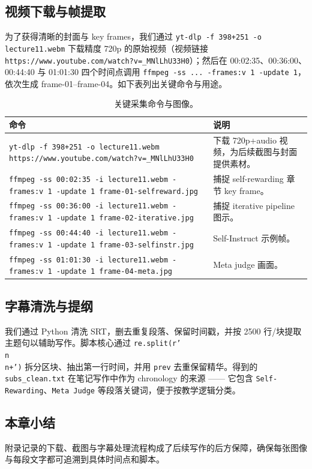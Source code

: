 \documentclass[a4paper]{article}
\begin{document}
\subsection{视频下载与帧提取}
为了获得清晰的封面与 key frames，我们通过 \texttt{yt-dlp -f 398+251 -o lecture11.webm} 下载精度 720p 的原始视频（视频链接 \texttt{https://www.youtube.com/watch?v=\_MNlLhU33H0}）；然后在 00:02:35、00:36:00、00:44:40 与 01:01:30 四个时间点调用 \texttt{ffmpeg -ss ... -frames:v 1 -update 1}，依次生成 frame-01–frame-04。如下表列出关键命令与用途。

\begin{table}[H]
\centering
\begin{tabular}{p{6cm}p{9cm}}
\toprule
命令 & 说明 \\
\midrule
\texttt{yt-dlp -f 398+251 -o lecture11.webm https://www.youtube.com/watch?v=\_MNlLhU33H0} & 下载 720p+audio 视频，为后续截图与封面提供素材。 \\
\texttt{ffmpeg -ss 00:02:35 -i lecture11.webm -frames:v 1 -update 1 frame-01-selfreward.jpg} & 捕捉 self-rewarding 章节 key frame。 \\
\texttt{ffmpeg -ss 00:36:00 -i lecture11.webm -frames:v 1 -update 1 frame-02-iterative.jpg} & 捕捉 iterative pipeline 图示。 \\
\texttt{ffmpeg -ss 00:44:40 -i lecture11.webm -frames:v 1 -update 1 frame-03-selfinstr.jpg} & Self-Instruct 示例帧。 \\
\texttt{ffmpeg -ss 01:01:30 -i lecture11.webm -frames:v 1 -update 1 frame-04-meta.jpg} & Meta judge 画面。 \\
\bottomrule
\end{tabular}
\caption{关键采集命令与图像。}
\end{table}

\subsection{字幕清洗与提纲}
我们通过 Python 清洗 SRT，删去重复段落、保留时间戳，并按 2500 行/块提取主题句以辅助写作。脚本核心通过 \texttt{re.split(r'\\n\\n+')} 拆分区块、抽出第一行时间，并用 \texttt{prev} 去重保留精华。得到的 \texttt{subs\_clean.txt} 在笔记写作中作为 chronology 的来源 —— 它包含 \texttt{Self-Rewarding}、\texttt{Meta Judge} 等段落关键词，便于按教学逻辑分类。

\subsection{本章小结}
附录记录的下载、截图与字幕处理流程构成了后续写作的后方保障，确保每张图像与每段文字都可追溯到具体时间点和脚本。
\end{document}
